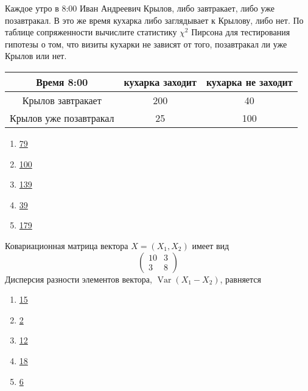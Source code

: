 \documentclass[t]{beamer}
\DeclareMathOperator{\Var}{Var}
\begin{document}
 \begin{frame} \label{47} 
\begin{block}{47} 

Каждое утро в 8:00 Иван Андреевич Крылов, либо завтракает, либо уже позавтракал. В это же время кухарка либо заглядывает к Крылову, либо нет. По таблице сопряженности вычислите  статистику $\chi^2$ Пирсона для тестирования гипотезы о том, что визиты кухарки не зависят от того, позавтракал ли уже Крылов или нет.
\begin{tabular}{c|cc}
Время 8:00 & кухарка заходит & кухарка не заходит \\
\hline
Крылов завтракает & 200 & 40 \\
Крылов уже позавтракал & 25 & 100 \\
\end{tabular}
 


 \end{block} 
\begin{enumerate} 
\item[] \hyperlink{47-No}{\beamergotobutton{} 79}
\item[] \hyperlink{47-No}{\beamergotobutton{} 100}
\item[] \hyperlink{47-Yes}{\beamergotobutton{} 139}
\item[] \hyperlink{47-No}{\beamergotobutton{} 39}
\item[] \hyperlink{47-No}{\beamergotobutton{} 179}
\end{enumerate} 
\end{frame} 


 \begin{frame} \label{48} 
\begin{block}{48} 

Ковариационная матрица вектора $X=(X_1,X_2)$ имеет вид
\[
\begin{pmatrix}
10 & 3 \\
3 & 8
\end{pmatrix}
\]
Дисперсия разности элементов вектора, $\Var(X_1-X_2)$, равняется
 


 \end{block} 
\begin{enumerate} 
\item[] \hyperlink{48-No}{\beamergotobutton{} 15}
\item[] \hyperlink{48-No}{\beamergotobutton{} 2}
\item[] \hyperlink{48-Yes}{\beamergotobutton{} 12}
\item[] \hyperlink{48-No}{\beamergotobutton{} 18}
\item[] \hyperlink{48-No}{\beamergotobutton{} 6}
\end{enumerate} 
\end{frame} 
\end{document}
